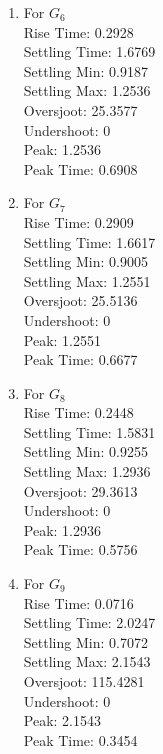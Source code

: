 \documentclass[12pt, a4paper]{article}
\begin{document}
	\begin{enumerate}
		\item For $G_6$ \\
		Rise Time: 0.2928 \\
		Settling Time: 1.6769 \\
		Settling Min: 0.9187 \\
		Settling Max: 1.2536 \\
		Oversjoot: 25.3577 \\
		Undershoot: 0 \\
		Peak: 1.2536 \\
		Peak Time: 0.6908 \\

		\item For $G_7$ \\
		Rise Time: 0.2909 \\
		Settling Time: 1.6617 \\
		Settling Min: 0.9005 \\
		Settling Max: 1.2551 \\
		Oversjoot: 25.5136 \\
		Undershoot: 0 \\
		Peak: 1.2551 \\
		Peak Time: 0.6677 \\

		\item For $G_8$ \\
		Rise Time: 0.2448 \\
		Settling Time: 1.5831 \\
		Settling Min: 0.9255 \\
		Settling Max: 1.2936 \\
		Oversjoot: 29.3613 \\
		Undershoot: 0 \\
		Peak: 1.2936 \\
		Peak Time: 0.5756 \\

		\item For $G_9$ \\
		Rise Time: 0.0716 \\
		Settling Time: 2.0247 \\
		Settling Min: 0.7072 \\
		Settling Max: 2.1543 \\
		Oversjoot: 115.4281 \\
		Undershoot: 0 \\
		Peak: 2.1543 \\
		Peak Time: 0.3454 \\
		
	\end{enumerate}
\end{document}
